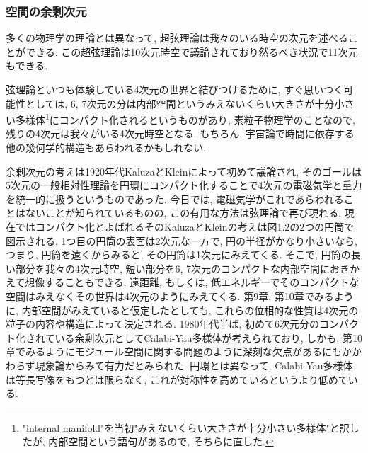 \documentclass[10pt,a4paper]{jsarticle}
\begin{document}
\subsubsection*{空間の余剰次元}
多くの物理学の理論とは異なって, 超弦理論は我々のいる時空の次元を述べることができる. この超弦理論は10次元時空で議論されており然るべき状況で11次元もできる. \par
弦理論といつも体験している4次元の世界と結びつけるために, すぐ思いつく可能性としては, 6, 7次元の分は内部空間というみえないくらい大きさが十分小さい多様体\footnote{"internal manifold"を当初"みえないくらい大きさが十分小さい多様体"と訳したが, 内部空間という語句があるので, そちらに直した. }にコンパクト化されるというものがあり, 素粒子物理学のことなので, 残りの4次元は我々がいる4次元時空となる. もちろん, 宇宙論で時間に依存する他の幾何学的構造もあらわれるかもしれない. \par
余剰次元の考えは1920年代KaluzaとKleinによって初めて議論され, そのゴールは5次元の一般相対性理論を円環にコンパクト化することで4次元の電磁気学と重力を統一的に扱うというものであった. 今日では, 電磁気学がこれであらわれることはないことが知られているものの, この有用な方法は弦理論で再び現れる. 現在ではコンパクト化とよばれるそのKaluzaとKleinの考えは図1.2の2つの円筒で図示される. 1つ目の円筒の表面は2次元な一方で, 円の半径がかなり小さいなら, つまり, 円筒を遠くからみると, その円筒は1次元にみえてくる. そこで, 円筒の長い部分を我々の4次元時空, 短い部分を6, 7次元のコンパクトな内部空間におきかえて想像することもできる. 遠距離, もしくは, 低エネルギーでそのコンパクトな空間はみえなくその世界は4次元のようにみえてくる. 第9章, 第10章でみるように, 内部空間がみえていると仮定したとしても, これらの位相的な性質は4次元の粒子の内容や構造によって決定される. 1980年代半ば, 初めて6次元分のコンパクト化されている余剰次元としてCalabi-Yau多様体が考えられており, しかも, 第10章でみるようにモジュール空間に関する問題のように深刻な欠点があるにもかかわらず現象論からみて有力だとみられた. 円環とは異なって, Calabi-Yau多様体は等長写像をもつとは限らなく, これが対称性を高めているというより低めている. 
\end{document}
